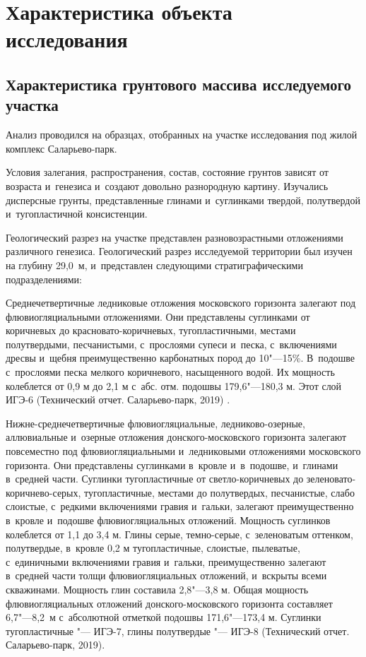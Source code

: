 \chapter{Характеристика объекта исследования}
\section{Характеристика грунтового массива исследуемого участка}
Анализ проводился на образцах, отобранных на участке исследования  под жилой комплекс Саларьево-парк.

Условия залегания, распространения, состав, состояние  грунтов зависят от возраста и~генезиса и~создают довольно разнородную картину. Изучались дисперсные грунты, представленные глинами и~суглинками твердой, полутвердой и~тугопластичной консистенции.


Геологический разрез на участке представлен разновозрастными отложениями различного генезиса.
Геологический разрез исследуемой территории был изучен на глубину 29,0~м, и~представлен следующими стратиграфическими подразделениями:

 Среднечетвертичные ледниковые отложения московского горизонта  залегают под флювиогляциальными отложениями. Они представлены суглинками от коричневых до красновато-коричневых, тугопластичными, местами полутвердыми, песчанистыми, с~прослоями супеси и~песка, с~включениями дресвы и~щебня преимущественно карбонатных пород до 10"---15\%. В~подошве с~прослоями песка мелкого коричневого, насыщенного водой. Их мощность колеблется от 0,9 м до 2,1 м с~абс. отм. подошвы 179,6"---180,3 м. Этот слой ИГЭ-6 (Технический отчет. Саларьево-парк, 2019) \cite{moshkin2019}.

Нижне-среднечетвертичные флювиогляциальные, ледниково-озерные, аллювиальные и~озерные отложения донского-московского горизонта  залегают повсеместно под флювиогляциальными и~ледниковыми отложениями московского горизонта. Они представлены суглинками в~кровле и~в~подошве, и~глинами в~средней части. Суглинки тугопластичные от светло-коричневых до зеленовато-коричнево-серых, тугопластичные, местами до полутвердых, песчанистые, слабо слоистые, с~редкими включениями гравия и~гальки, залегают преимущественно в~кровле и~подошве флювиогляциальных отложений. Мощность суглинков колеблется от 1,1 до 3,4 м. Глины серые, темно-серые, с~зеленоватым оттенком, полутвердые, в~кровле 0,2 м тугопластичные, слоистые, пылеватые, с~единичными включениями гравия и~гальки, преимущественно залегают в~средней части толщи флювиогляциальных отложений, и~вскрыты всеми скважинами. Мощность глин составила 2,8"---3,8 м. Общая мощность флювиогляциальных отложений донского-московского горизонта составляет 6,7"---8,2~м с~абсолютной отметкой подошвы 171,6"---173,4 м. Суглинки тугопластичные "--- ИГЭ-7, глины полутвердые "--- ИГЭ-8 (Технический отчет. Саларьево-парк, 2019).

